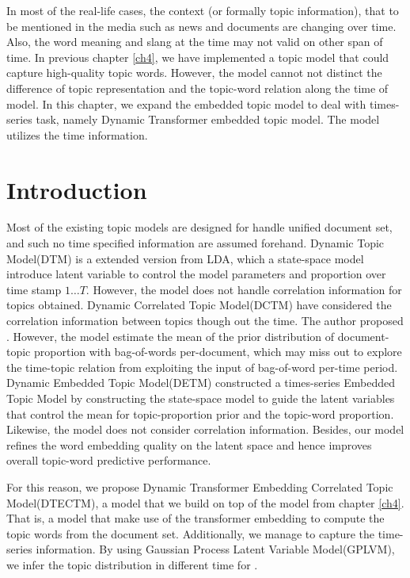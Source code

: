 In most of the real-life cases, the context (or formally topic information), that to be mentioned in the media such as news and documents are changing over time. Also, the word meaning and slang at the time may not valid on other span of time.
In previous chapter \ref{ch4}, we have implemented a topic model that could capture high-quality topic words. However, the model cannot not distinct the difference of topic representation and the topic-word relation along the time of model.
In this chapter, we expand the embedded topic model to deal with times-series task, namely Dynamic Transformer embedded topic model. The model utilizes the time information.
\section{Introduction}
Most of the existing topic models are designed for handle unified document set, and such no time specified information are assumed forehand. 
Dynamic Topic Model(DTM)\cite{blei_dynamic_2006} is a extended version from LDA, which a state-space model introduce latent variable to control the model parameters and proportion over time stamp $ 1\dots T $. However, the model does not handle correlation information for topics obtained.
Dynamic Correlated Topic Model(DCTM)\cite{tomasi_stochastic_nodate} have considered the correlation information between topics though out the time. The author proposed . However, the model estimate the mean of the prior distribution of document-topic proportion with bag-of-words per-document, which may miss out to explore the time-topic relation from exploiting the input of bag-of-word per-time period.
Dynamic Embedded Topic Model(DETM)\cite{dieng_dynamic_2019} constructed a times-series Embedded Topic Model by constructing the state-space model to guide the latent variables that control the mean for topic-proportion prior and the topic-word proportion. Likewise, the model does not consider correlation information. Besides, our model refines the word embedding quality on the latent space and hence improves overall topic-word predictive performance.

For this reason, we propose Dynamic Transformer Embedding Correlated Topic Model(DTECTM), a model that we build on top of the model from chapter \ref{ch4}. That is, a model that make use of the transformer embedding to compute the topic words from the document set. Additionally, we manage to capture the time-series information. By using Gaussian Process Latent Variable Model(GPLVM), we infer the topic distribution in different time for .
